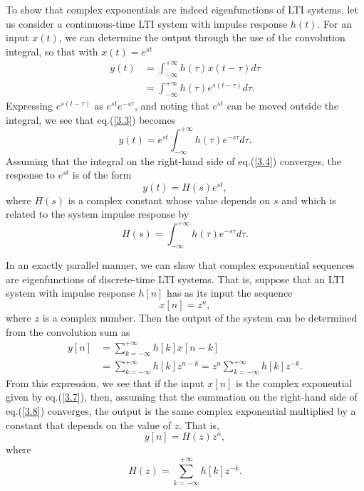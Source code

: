 \documentclass[a4paper,twoside]{book}
\begin{document}
To show that complex exponentials are indeed eigenfunctions of LTI systems, let us consider a continuous-time LTI system with impulse response $h(t)$. For an input $x(t)$, we can determine the output through the use of the convolution integral, so that with $x(t)=e^{st}$
\begin{equation}
    \begin{aligned}y(t)&=\int_{-\infty}^{+\infty}h(\tau)x(t-\tau) d\tau\\&=\int_{-\infty}^{+\infty}h(\tau)e^{s(t-\tau)} d\tau.\end{aligned}
    \label{3.3}
\end{equation}
Expressing $e^{s(t-\tau)}$ as $e^{st}e^{-s\tau}$, and noting that $e^{st}$ can be moved outside the integral, we see that eq.\;(\ref{3.3}) becomes
\begin{equation}
    y(t) = e^{st}\int_{-\infty}^{+\infty}h(\tau)e^{-s\tau} d\tau.
    \label{3.4}
\end{equation}
Assuming that the integral on the right-hand side of eq.\;(\ref{3.4}) converges, the response to $e^{st}$ is of the form
\begin{equation}
    y(t)=H(s)e^{st},
    \label{3.5}
\end{equation}
where $H(s)$ is a complex constant whose value depends on $s$ and which is related to the system impulse response by
\begin{equation}
    H(s)=\int_{-\infty}^{+\infty}h(\tau)e^{-s\tau} d\tau.
    \label{3.6}
\end{equation}

In an exactly parallel manner, we can show that complex exponential sequences are eigenfunctions of discrete-time LTI systems. That is, suppose that an LTI system with impulse response $h[n]$ has as its input the sequence
\begin{equation}
    x[n]=z^n,
    \label{3.7}
\end{equation}
where $z$ is a complex number. Then the output of the system can be determined from the convolution sum as
\begin{equation}
    \begin{aligned}y[n]&=\sum_{k=-\infty}^{+\infty}h[k]x[n-k]\\&=\sum_{k=-\infty}^{+\infty}h[k]z^{n-k}=z^{n}\sum_{k=-\infty}^{+\infty}h[k]z^{-k}.\end{aligned}
    \label{3.8}
\end{equation}
From this expression, we see that if the input $x[n]$ is the complex exponential given by eq.\;(\ref{3.7}), then, assuming that the summation on the right-hand side of eq.\;(\ref{3.8}) converges, the output is the same complex exponential multiplied by a constant that depends on the value of $z$. That is,
\begin{equation}
    y[n]=H(z)z^n,
    \label{3.9}
\end{equation}
where
\begin{equation}
    H(z)=\sum_{k=-\infty}^{+\infty}h[k]z^{-k}.
    \label{3.10}
\end{equation}
\end{document}

